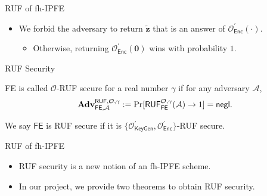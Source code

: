 \begin{frame}{RUF of fh-IPFE}

\begin{itemize}
	\item We forbid the adversary to return $\mathbf{\tilde{z}}$ that is an answer of $\mathcal{O}^\prime_{\textsf{Enc}}(\cdot)$.
	\begin{itemize}
		\item Otherwise, returning $\mathcal{O}^\prime_{\textsf{Enc}}(\mathbf{0})$ wins with probability $1$.
	\end{itemize}

\end{itemize}

\begin{definition}{RUF Security}

	\textsf{FE} is called $\mathcal{O}$-RUF secure for a real number $\gamma$ if for any adversary $\mathcal{A}$,
	\[
		\mathbf{Adv}_{\textsf{FE}, \mathcal{A}}^{\textsf{RUF}, \mathcal{O}, \gamma} := \Pr[\textsf{RUF}^{\mathcal{O}, \gamma}_{\textsf{FE}}(\mathcal{A}) \to 1 ] = \mathsf{negl}.
	\]

\noindent We say $\textsf{FE}$ is RUF secure if it is $\{ \mathcal{O}^\prime_{\textsf{KeyGen}}, \mathcal{O}^\prime_{\textsf{Enc}} \}$-RUF secure.

\end{definition}

\end{frame}


\begin{frame}{RUF of fh-IPFE}

\begin{itemize}

	\item<1-> RUF security is a new notion of an fh-IPFE scheme.

	\item<2-> In our project, we provide two theorems to obtain RUF security.

\end{itemize}




\end{frame}


